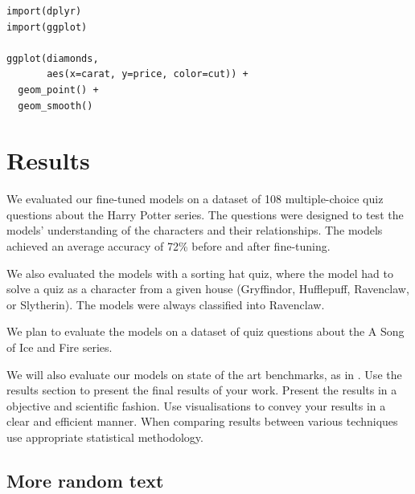 \documentclass[fleqn,moreauthors,10pt]{ds_report}
\begin{document}
\lstset{language=Python}


\lstset{language=R}
\begin{lstlisting}
import(dplyr)
import(ggplot)

ggplot(diamonds,
	   aes(x=carat, y=price, color=cut)) +
  geom_point() +
  geom_smooth()
\end{lstlisting}


\section*{Results}


We evaluated our fine-tuned models on a dataset of 108 multiple-choice quiz questions about the Harry Potter series.
The questions were designed to test the models' understanding of the characters and their relationships.
The models achieved an average accuracy of 72\% before and after fine-tuning.

We also evaluated the models with a sorting hat quiz, where the model had to solve a quiz as a character from a given house (Gryffindor, Hufflepuff, Ravenclaw, or Slytherin).
The models were always classified into Ravenclaw.

We plan to evaluate the models on a dataset of quiz questions about the A Song of Ice and Fire series.

We will also evaluate our models on state of the art benchmarks, as in \cite{guo2023evaluating}.
Use the results section to present the final results of your work. Present the results in a objective and scientific fashion. Use visualisations to convey your results in a clear and efficient manner. When comparing results between various techniques use appropriate statistical methodology.

\subsection*{More random text}
\end{document}
